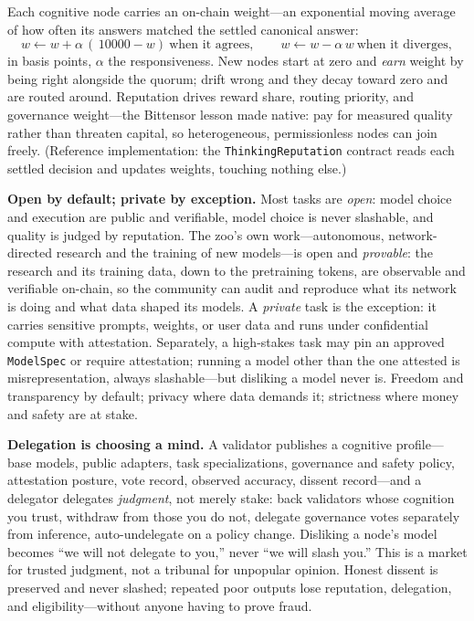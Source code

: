 \documentclass[11pt]{article}
\begin{document}
Each cognitive node carries an on-chain weight---an exponential moving average of how often its answers matched the settled canonical answer:
\[
w \leftarrow w + \alpha\,(\,\text{10000} - w)\ \text{when it agrees},\qquad
w \leftarrow w - \alpha\,w\ \text{when it diverges},
\]
in basis points, $\alpha$ the responsiveness. New nodes start at zero and \emph{earn} weight by being right alongside the quorum; drift wrong and they decay toward zero and are routed around. Reputation drives reward share, routing priority, and governance weight---the Bittensor lesson made native: pay for measured quality rather than threaten capital, so heterogeneous, permissionless nodes can join freely. (Reference implementation: the \texttt{ThinkingReputation} contract reads each settled decision and updates weights, touching nothing else.)

\textbf{Open by default; private by exception.} Most tasks are \emph{open}: model choice and execution are public and verifiable, model choice is never slashable, and quality is judged by reputation. The zoo's own work---autonomous, network-directed research and the training of new models---is open and \emph{provable}: the research and its training data, down to the pretraining tokens, are observable and verifiable on-chain, so the community can audit and reproduce what its network is doing and what data shaped its models. A \emph{private} task is the exception: it carries sensitive prompts, weights, or user data and runs under confidential compute with attestation. Separately, a high-stakes task may pin an approved \texttt{ModelSpec} or require attestation; running a model other than the one attested is misrepresentation, always slashable---but disliking a model never is. Freedom and transparency by default; privacy where data demands it; strictness where money and safety are at stake.

\textbf{Delegation is choosing a mind.} A validator publishes a cognitive profile---base models, public adapters, task specializations, governance and safety policy, attestation posture, vote record, observed accuracy, dissent record---and a delegator delegates \emph{judgment}, not merely stake: back validators whose cognition you trust, withdraw from those you do not, delegate governance votes separately from inference, auto-undelegate on a policy change. Disliking a node's model becomes ``we will not delegate to you,'' never ``we will slash you.'' This is a market for trusted judgment, not a tribunal for unpopular opinion. Honest dissent is preserved and never slashed; repeated poor outputs lose reputation, delegation, and eligibility---without anyone having to prove fraud.
\end{document}
